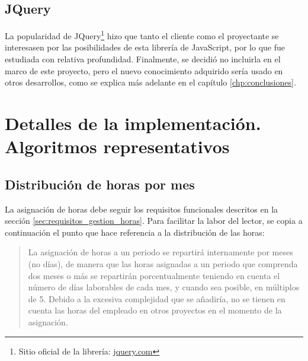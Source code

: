 \subsection{JQuery}

La popularidad de JQuery\footnote{Sitio oficial de la librería:
\href{http://jquery.com/}{
jquery.com}} hizo que tanto el cliente como el
proyectante se interesasen por las posibilidades de esta librería de JavaScript,
por lo que fue estudiada con relativa profundidad. Finalmente, se decidió no
incluirla en el marco de este proyecto, pero el nuevo conocimiento adquirido
sería usado en otros desarrollos, como se explica más adelante en el capítulo
\ref{chp:conclusiones}.

\section{Detalles de la implementación. Algoritmos representativos}

\subsection{Distribución de horas por mes}
\label{sec:algoritmo_distribucion}

La asignación de horas debe seguir los requisitos funcionales descritos en la
sección \ref{sec:requisitos_gestion_horas}. Para facilitar la labor del lector,
se copia a continuación el punto que hace referencia a la distribución de las
horas:

\begin{quote}
La asignación de horas a un periodo se repartirá internamente por meses (no
días), de manera que las horas asignadas a un periodo que comprenda dos meses o
más se repartirán porcentualmente teniendo en cuenta el número de días
laborables de cada mes, y cuando sea posible, en múltiplos de 5. Debido a la
excesiva complejidad que se añadiría, no se tienen en cuenta las horas del
empleado en otros proyectos en el momento de la asignación.
\end{quote}

